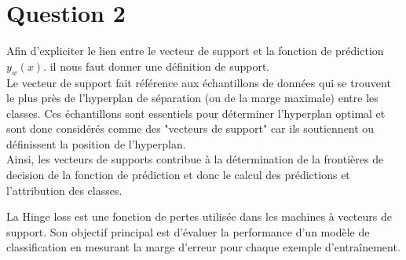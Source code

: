 \documentclass{article}
\begin{document}
\clearpage
\section{Question 2}
Afin d'expliciter le lien entre le vecteur de support et la fonction de prédiction $y_{w}(x)$. il nous faut donner une définition de support.\\
Le vecteur de support fait référence aux échantillons de données qui se trouvent le plus près de l'hyperplan de séparation (ou de la marge maximale) entre les classes. Ces échantillons sont essentiels pour déterminer l'hyperplan optimal et sont donc considérés comme des "vecteurs de support" car ils soutiennent ou définissent la position de l'hyperplan. \\
Ainsi, les vecteurs de supports contribue à la détermination de la frontières de decision de la fonction de prédiction et donc le calcul des prédictions et l'attribution des classes.

La Hinge loss est une fonction de pertes utilisée dans les machines à vecteurs de support. Son objectif principal est d'évaluer la performance d'un modèle de classification en mesurant la marge d'erreur pour chaque exemple d'entraînement.
\end{document}
